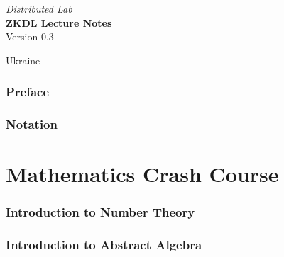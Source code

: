 \documentclass{zkdl-template}
\def\maketitle{
    \begin{center}
        {\Large\sffamily \emph{Distributed Lab}} \\ \vspace{30mm}
        {\huge\sffamily\bfseries ZKDL Lecture Notes} \\ \vspace{5mm}
        {Version 0.3} \\ \vspace{10mm}
    \end{center}
    
    \vfill

    \begin{center}
        {Ukraine} \\ \vspace{2mm}
        {\sffamily \the\year}
    \end{center}

    \thispagestyle{empty}
    \pagebreak
}
\begin{document}
    \maketitle


    \pagecolor{white}

    \vspace*{\fill}
    
    \begin{abstract}
        \fontsize{10}{12}\selectfont

        \vspace{5mm}

        
    \end{abstract}

    \vspace*{\fill}

    \thispagestyle{empty}
    \newpage


    \pagestyle{fancy}
    \pagecolor{white}

    \tableofcontents

    \pagebreak


    \section{Preface}
    

    \section{Notation}\label{section:notation}
    


    \part{Mathematics Crash Course}
    

    \section{Introduction to Number Theory}\label{section:number-theory}
    

    \section{Introduction to Abstract Algebra}\label{section:abstract-algebra}
    
\end{document}
